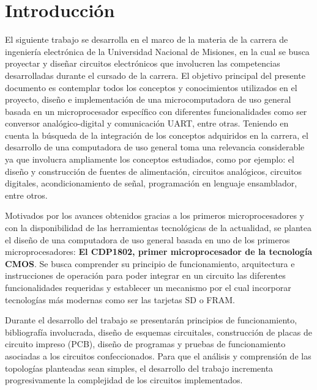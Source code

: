  \chapter{Introducción}

\label{C:introduccion}

El siguiente trabajo se desarrolla en el marco de la materia  de la carrera de ingeniería electrónica de la Universidad Nacional de Misiones, en la cual se busca proyectar y diseñar circuitos electrónicos que involucren las competencias desarrolladas durante el cursado de la carrera. 
El objetivo principal del presente documento es contemplar todos los conceptos y conocimientos utilizados en el proyecto, diseño e implementación de una microcomputadora de uso general basada en un microprocesador específico con diferentes funcionalidades como ser conversor analógico-digital y comunicación UART, entre otras. Teniendo en cuenta la búsqueda de la integración de los conceptos adquiridos en la carrera, el desarrollo de una computadora de uso general toma una relevancia considerable ya que involucra ampliamente los conceptos estudiados, como por ejemplo: el diseño y construcción de fuentes de alimentación, circuitos analógicos, circuitos digitales, acondicionamiento de señal, programación en lenguaje ensamblador, entre otros. 

Motivados por los avances obtenidos gracias a los primeros microprocesadores y con la disponibilidad de las herramientas tecnológicas de la actualidad, se plantea el diseño de una computadora de uso general basada en uno de los primeros microprocesadores: \textbf{El CDP1802, primer microprocesador de la tecnología CMOS}. Se busca comprender su principio de funcionamiento, arquitectura e instrucciones de operación para poder integrar en un circuito las diferentes funcionalidades requeridas y establecer un mecanismo por el cual incorporar tecnologías más modernas como ser las tarjetas SD o FRAM. 

Durante el desarrollo del trabajo se presentarán principios de funcionamiento, bibliografía involucrada, diseño de esquemas circuitales, construcción de placas de circuito impreso (PCB), diseño de programas y pruebas de funcionamiento asociadas a los circuitos confeccionados. Para que el análisis y comprensión de las topologías planteadas sean simples, el desarrollo del trabajo incrementa progresivamente la complejidad de los circuitos implementados. 


